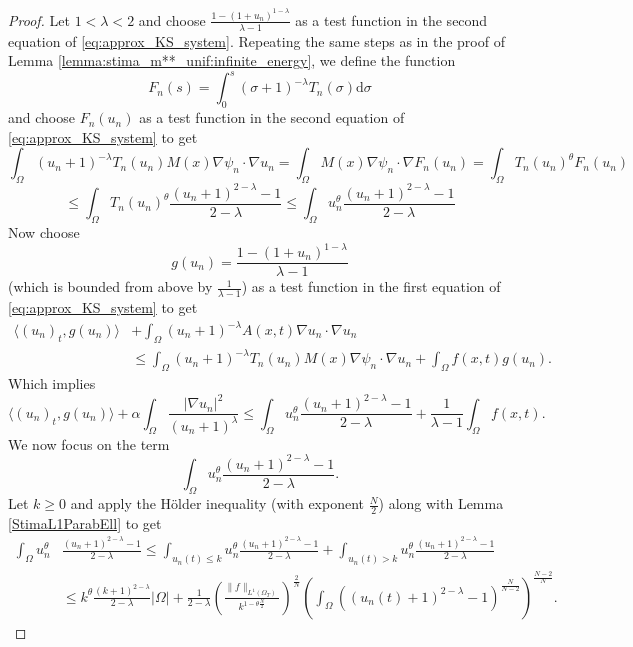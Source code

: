 \documentclass[10pt,a4paper]{amsart}
\newcommand{\abs}[1]{\left|#1\right|}
\def\elleomT#1{L^{#1}(\Omega_T)}
\def\io{\int_\Omega}
\def\norma#1#2{ \|#1 \|_{#2}}
\begin{document}
\begin{proof}
    Let $1<\lambda<2$ and choose $\frac{1-(1+u_n)^{1-\lambda}}{\lambda-1}$ as a test function in the second equation of \eqref{eq:approx_KS_system}. Repeating the same steps as in the proof of Lemma \ref{lemma:stima_m**_unif:infinite_energy}, we define the function
    $$F_n(s)=\int_0^s (\sigma+1)^{-\lambda}T_n(\sigma) \mathrm{d}\sigma$$
    and choose $F_n(u_n)$ as a test function in the second equation of \eqref{eq:approx_KS_system} to get
    $$
    \io (u_n+1)^{-\lambda}T_n(u_n) M(x)\nabla \psi_n\cdot\nabla u_n 
    =
    \io M(x)\nabla \psi_n\cdot\nabla F_n(u_n)
    =
    \io T_n(u_n)^\theta F_n(u_n)
    $$
    $$
    \leq \io T_n(u_n)^\theta \frac{(u_n+1)^{2-\lambda}-1}{2-\lambda}
    \leq
    \io u_n^{\theta} \frac{(u_n+1)^{2-\lambda}-1}{2-\lambda}
    $$
    Now choose 
    $$g(u_n)=\frac{1-(1+u_n)^{1-\lambda}}{\lambda-1}$$
    (which is bounded from above by $\frac{1}{\lambda-1}$) as a test function in the first equation of \eqref{eq:approx_KS_system} to get
\begin{equation}\label{eq:proof:stima1**:eq0}
    \begin{split}
            \langle (u_n)_t,g(u_n)\rangle&
    +\io(u_n+1)^{-\lambda}A(x,t)\nabla u_n \cdot \nabla u_n\\&
    \leq
    \io (u_n+1)^{-\lambda}T_n(u_n) M(x)\nabla \psi_n\cdot\nabla u_n 
    +\io f(x,t)g(u_n).
    \end{split}
\end{equation}
    Which implies
    \begin{equation}\label{EQ_stimagrad_Parabell_fL1}
        \langle (u_n)_t,g(u_n)\rangle+\alpha\io\frac{\abs{\nabla u_n}^2}{(u_n+1)^{\lambda}}
        \leq
        \io u_n^{\theta} \frac{(u_n+1)^{2-\lambda}-1}{2-\lambda}+\frac{1}{\lambda-1}\io f(x,t).        
    \end{equation}
    We now focus on the term
    $$\io u_n^{\theta} \frac{(u_n+1)^{2-\lambda}-1}{2-\lambda}.$$
    Let $k\geq0$ and apply the H\"older inequality (with exponent $\frac{N}{2}$) along with Lemma \ref{StimaL1ParabEll} to get
    \begin{equation}\label{eq:proof:stima1**:eq1}
        \begin{split}
            \io u_n^{\theta} &\frac{(u_n+1)^{2-\lambda}-1}{2-\lambda}
    \leq \int_{u_n(t)\leq k} u_n^{\theta} \frac{(u_n+1)^{2-\lambda}-1}{2-\lambda} + 
    \int_{u_n(t)> k} u_n^{\theta} \frac{(u_n+1)^{2-\lambda}-1}{2-\lambda}\\
    &\leq
    k^{\theta}\frac{(k+1)^{2-\lambda}}{2-\lambda}\abs{\Omega}+\frac{1}{2-\lambda}
    \left(\frac{\norma{f}{\elleomT1}}{k^{1-\theta\frac{N}{2}}}\right)^\frac{2}{N}
    \left(\io \left((u_n(t)+1)^{2-\lambda}-1\right)^{\frac{N}{N-2}}\right)^{\frac{N-2}{N}}.
        \end{split}
    \end{equation}
    

\end{proof}
\end{document}
